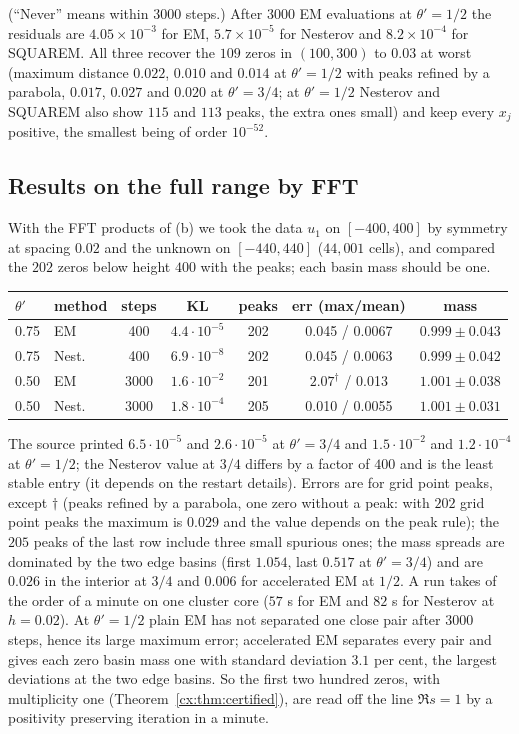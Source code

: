 \noindent (``Never'' means within $3000$ steps.) After $3000$ EM evaluations at $\theta'=1/2$ the residuals are $4.05\times10^{-3}$ for EM, $5.7\times10^{-5}$ for Nesterov and $8.2\times10^{-4}$ for SQUAREM. All three recover the $109$ zeros in $(100,300)$ to $0.03$ at worst (maximum distance $0.022$, $0.010$ and $0.014$ at $\theta'=1/2$ with peaks refined by a parabola, $0.017$, $0.027$ and $0.020$ at $\theta'=3/4$; at $\theta'=1/2$ Nesterov and SQUAREM also show $115$ and $113$ peaks, the extra ones small) and keep every $x_j$ positive, the smallest being of order $10^{-52}$.

\subsection{Results on the full range by FFT}

With the FFT products of (b) we took the data $u_1$ on $[-400,400]$ by symmetry at spacing $0.02$ and the unknown on $[-440,440]$ ($44{,}001$ cells), and compared the $202$ zeros below height $400$ with the peaks; each basin mass should be one.

\begin{center}
\footnotesize
\begin{tabular}{llccccc}
\toprule
$\theta'$ & method & steps & KL & peaks & err (max/mean) & mass\\
\midrule
0.75 & EM & 400 & $4.4\cdot10^{-5}$ & 202 & 0.045 / 0.0067 & $0.999\pm0.043$\\
0.75 & Nest. & 400 & $6.9\cdot10^{-8}$ & 202 & 0.045 / 0.0063 & $0.999\pm0.042$\\
0.50 & EM & 3000 & $1.6\cdot10^{-2}$ & 201 & $2.07^{\dagger}$ / 0.013 & $1.001\pm0.038$\\
0.50 & Nest. & 3000 & $1.8\cdot10^{-4}$ & 205 & 0.010 / 0.0055 & $1.001\pm0.031$\\
\bottomrule
\end{tabular}
\end{center}

\noindent The source printed $6.5\cdot10^{-5}$ and $2.6\cdot10^{-5}$ at $\theta'=3/4$ and $1.5\cdot10^{-2}$ and $1.2\cdot10^{-4}$ at $\theta'=1/2$; the Nesterov value at $3/4$ differs by a factor of $400$ and is the least stable entry (it depends on the restart details). Errors are for grid point peaks, except $\dagger$ (peaks refined by a parabola, one zero without a peak: with $202$ grid point peaks the maximum is $0.029$ and the value depends on the peak rule); the $205$ peaks of the last row include three small spurious ones; the mass spreads are dominated by the two edge basins (first $1.054$, last $0.517$ at $\theta'=3/4$) and are $0.026$ in the interior at $3/4$ and $0.006$ for accelerated EM at $1/2$. A run takes of the order of a minute on one cluster core ($57$ s for EM and $82$ s for Nesterov at $h=0.02$). At $\theta'=1/2$ plain EM has not separated one close pair after $3000$ steps, hence its large maximum error; accelerated EM separates every pair and gives each zero basin mass one with standard deviation $3.1$ per cent, the largest deviations at the two edge basins. So the first two hundred zeros, with multiplicity one (Theorem~\ref{cx:thm:certified}), are read off the line $\Re s=1$ by a positivity preserving iteration in a minute.

